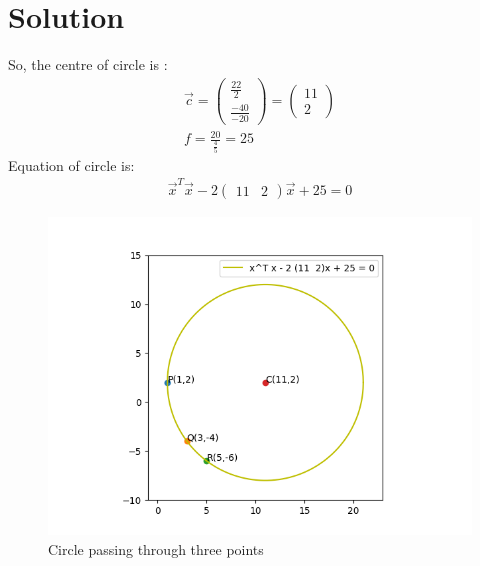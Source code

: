 \documentclass[journal,12pt,twocolumn]{IEEEtran}
\begin{document}
\section{Solution}
So, the centre of circle is :
\begin{align}
   \vec{c} = \begin{pmatrix}  \frac{22}{2} \\ \frac{-40}{-20} \end{pmatrix} = \begin{pmatrix}  11 \\ 2 \end{pmatrix}  \\
    f = \frac{20}{\frac{4}{5}} = 25 
\end{align}
Equation of circle is:
\begin{align}
    \vec{x}^T \vec{x} -2\begin{pmatrix}  11 & 2 \end{pmatrix} \vec{x} + 25 = 0 
\end{align}
\begin{figure}[t]
    \centering
    \includegraphics[width = \columnwidth]{AI_assignment_3.png}
    \caption{Circle passing through three points}
    \label{fig:Circle}
\end{figure}
\end{document}
